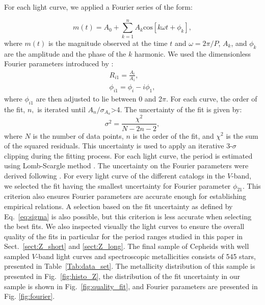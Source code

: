 \documentclass[article]{aa} %
\begin{document}
 For each light curve, we applied a Fourier series of the form:

\begin{equation}
m(t) = A_0 + \sum_{k=1}^n A_k \mathrm{cos}[k \omega t +\phi_k],
\end{equation}
where $m(t)$ is the magnitude observed at the time $t$ and $\omega=2\pi/P$, $A_k$, and $\phi_k$ are the amplitude and the phase of the $k$ harmonic. We used the dimensionless Fourier parameters introduced by \cite{SimonLee1981}:
\begin{gather}
    R_{i1}=\frac{A_i}{A_1},\\
    \phi_{i1}=\phi_i - i \phi_1,
\end{gather}
where $\phi_{i1}$ are then adjusted to lie between 0 and 2$\pi$.
For each curve, the order of the fit, $n,$ is iterated until $A_n/\sigma_{A_n}$>4.
The uncertainty of the fit is given by:
\begin{equation}\label{eq:sigma}
\sigma^2=\frac{\chi^2}{N-2n-2},
\end{equation}
where $N$ is the number of data points, $n$ is the order of the fit, and $\chi^2$ is the sum of the squared residuals. This uncertainty is used to apply an iterative 3-$\sigma$ clipping during the fitting process. For each light curve, the period is estimated using Lomb-Scargle method \citep{Lomb1976,Scargle1982}. The uncertainty on the Fourier parameters were derived following \cite{Petersen1986}.  For every light curve of the different catalogs in the $V$-band, we selected the fit having the smallest uncertainty for Fourier parameter $\phi_{21}$. This criterion also ensures Fourier parameters are accurate enough for establishing empirical relations. A selection based on the fit uncertainty as defined by Eq.~\ref{eq:sigma} is also possible, but this criterion is less accurate when selecting the best fits. We also inspected visually the light curves to ensure the overall quality of the fits in particular for the period ranges studied in this paper in Sect.~\ref{sect:Z_short} and \ref{sect:Z_long}. The final sample of Cepheids with well sampled $V$-band light curves and spectroscopic metallicities consists of 545 stars, presented in Table~\ref{Tab:data_set}. The metallicity distribution of this sample is presented in Fig.~\ref{fig:histo_Z}, the distribution of the fit uncertainty in our sample is shown in Fig.~\ref{fig:quality_fit}, and Fourier parameters are presented in Fig. \ref{fig:fourier}. 
\end{document}
